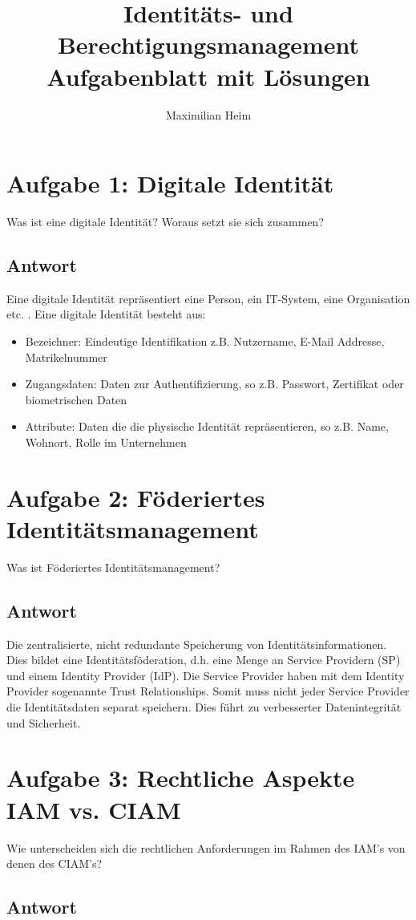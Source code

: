\documentclass[11pt]{article}
\author{Maximilian Heim}
\title{Identitäts- und Berechtigungsmanagement \\ \large{}Aufgabenblatt mit Lösungen}
\begin{document}
\maketitle
\section*{Aufgabe 1: Digitale Identität}
Was ist eine digitale Identität? Woraus setzt sie sich zusammen?
\subsection*{Antwort}
Eine digitale Identität repräsentiert eine Person, ein IT-System, eine Organisation etc. . Eine digitale Identität besteht aus:
\begin{itemize}
    \item Bezeichner: Eindeutige Identifikation z.B. Nutzername, E-Mail Addresse, Matrikelnummer
    \item Zugangsdaten: Daten zur Authentifizierung, so z.B. Passwort, Zertifikat oder biometrischen Daten
    \item Attribute: Daten die die physische Identität repräsentieren, so z.B. Name, Wohnort, Rolle im Unternehmen
\end{itemize}

\section*{Aufgabe 2: Föderiertes Identitätsmanagement}
Was ist Föderiertes Identitätsmanagement?
\subsection*{Antwort}
Die zentralisierte, nicht redundante Speicherung von Identitätsinformationen. Dies bildet eine Identitätsföderation, d.h. eine Menge an Service Providern (SP) und einem Identity Provider (IdP). Die Service Provider haben mit dem Identity Provider sogenannte Trust Relationships. Somit muss nicht jeder Service Provider die Identitätsdaten separat speichern. Dies führt zu verbesserter Datenintegrität und Sicherheit.

\section*{Aufgabe 3: Rechtliche Aspekte IAM vs. CIAM}
Wie unterscheiden sich die rechtlichen Anforderungen im Rahmen des IAM's von denen des CIAM's?
\subsection*{Antwort}
\end{document}
